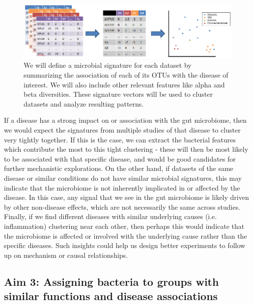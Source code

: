 \documentclass[12pt]{article}
\begin{document}
\begin{figure}
\begin{center}
\includegraphics[scale=0.6]{microbial_signatures}
\caption{We will define a microbial signature for each dataset by summarizing
the association of each of its OTUs with the disease of interest. We will
also include other relevant features like alpha and beta diversities. These 
signature vectors will be used to cluster datasets and analyze resulting patterns.}\label{fig:microbe_signatures}
\end{center}
\end{figure}

If a disease has a strong impact on or association with the gut 
microbiome, then we would expect the signatures from multiple studies of that disease
to cluster very tightly together. If this is the case, we can extract 
the bacterial features which contribute the most to this tight 
clustering - these will then be most likely to be associated with that 
specific disease, and would be good candidates for further mechanistic 
explorations. On the other hand, if datasets of the same disease or 
similar conditions do not have similar microbial signatures, this may 
indicate that the microbiome is not inherently implicated in or affected 
by the disease. In this case, any signal that we see in the gut 
microbiome is likely driven by other non-disease effects, which are 
not necessarily the same across studies. Finally, if we find different 
diseases with similar underlying causes (i.e. inflammation) clustering 
near each other, then perhaps this would indicate that the microbiome 
is affected or involved with the underlying cause rather than the 
specific diseases. Such insights could help us design better 
experiments to follow up on mechanism or causal relationships.

\subsection{Aim 3: Assigning bacteria to groups with similar functions and disease associations}
\end{document}
